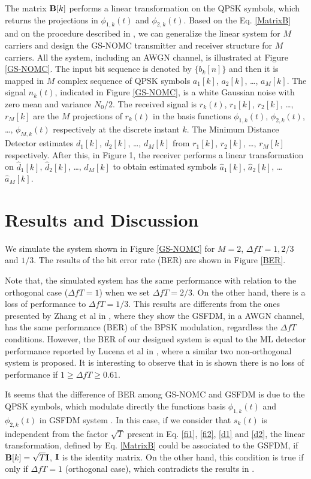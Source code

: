 \documentclass[twocolumn]{el-author}
\begin{document}
The matrix $\bold{B}[k]$ performs a linear transformation on the QPSK symbols, which returns the projections in $\phi_{1,k}(t)$ and $\phi_{2,k}(t)$. Based on the Eq. \ref{MatrixB} and on the procedure described in \cite{Zhang}, we can generalize the linear system for $M$ carriers and design the GS-NOMC transmitter and receiver structure for $M$ carriers. All the system, including an AWGN channel, is illustrated at Figure \ref{GS-NOMC}. The input bit sequence is denoted by $\{b_k[n]\}$ and then it is mapped in $M$ complex sequence of QPSK symbols $a_1[k]$, $a_2[k]$, \ldots, $a_M[k]$. The signal $n_k(t)$, indicated in Figure \ref{GS-NOMC}, is a white Gaussian noise with zero mean and variance $N_0/2$. The received signal is $r_k(t)$, $r_1[k]$, $r_2[k]$, \ldots, $r_M[k]$ are the $M$ projections of $r_k(t)$ in the basis functions $\phi_{1,k}(t)$, $\phi_{2,k}(t)$, \ldots, $\phi_{M,k}(t)$ respectively at the discrete instant $k$. The Minimum Distance Detector estimates $d_1[k]$, $d_2[k]$, \ldots, $d_M[k]$ from $r_1[k]$, $r_2[k]$, \ldots, $r_M[k]$ respectively. After this, in Figure 1, the receiver performs a linear transformation on $\hat{d}_1[k]$, $\hat{d}_2[k]$, \ldots, $\hat{d}_M[k]$  to obtain estimated symbols $\hat{a}_1[k]$, $\hat{a}_2[k]$, \ldots $\hat{a}_M[k]$.
\vspace{-0.11in}
\section{Results and Discussion}
We simulate the system shown in Figure \ref{GS-NOMC} for $M=2$, $\Delta fT=1, 2/3$ and $1/3$. The results of the bit error rate (BER) are shown in Figure \ref{BER}.

Note that, the simulated system has the same performance with relation to the orthogonal case ($\Delta fT=1$) when we set $\Delta fT=2/3$. On the other hand, there is a loss of performance to $\Delta fT=1/3$. This results are differents from the ones presented by Zhang et al in \cite{Zhang}, where they show the GSFDM, in a AWGN channel, has the same performance (BER) of the BPSK modulation, regardless the $\Delta fT$ conditions. However, the BER of our designed system is equal to the ML detector performance reported by Lucena et al in \cite{Lucena}, where a similar two non-orthogonal system is proposed. It is interesting to observe that in \cite{Lucena} is shown there is no loss of performance if $1\geq \Delta fT \geq 0.61$.

It seems that the difference of BER among GS-NOMC and GSFDM is due to the QPSK symbols, which modulate directly the functions basis $\phi_{1,k}(t)$ and $\phi_{2,k}(t)$ in GSFDM system \cite{Zhang}. In this case, if we consider that $s_k(t)$ is independent from the factor $\sqrt{T}$ present in Eq. \ref{fi1}, \ref{fi2}, \ref{d1} and \ref{d2}, the linear transformation, defined by Eq. \ref{MatrixB} could be associated to the GSFDM, if $\bold{B}[k]=\sqrt{T}\bold{I}$,  $\bold{I}$ is the identity matrix. On the other hand, this condition is true if only if $\Delta fT=1$ (orthogonal case), which contradicts the results in \cite{Zhang}. 
\end{document}
